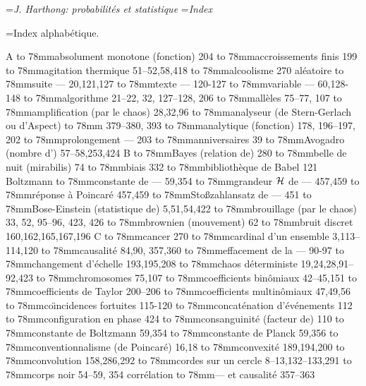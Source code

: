 


\auteurcourant={\sl J. Harthong: probabilit\'es et statistique}
\titrecourant={\sl Index}
\baselineskip=15pt

\def\term#1#2{\hbox to 78mm{#1\dotfill\hskip4pt #2}} 
\def\w{\hskip15pt} 
 
 
\titre={\tit Index alphab\'etique.} 
 
\hbox{A} 
\medskip 
\term{absolument monotone (fonction)}{204} 
\term{accroissements finis}{199} 
\term{agitation thermique}{51--52,58,418} 
\term{alcoolisme}{270} 
\hbox{al\'eatoire} 
\term{\w suite ---}{20,121,127} 
\term{\w texte ---}{120-127} 
\term{\w variable ---}{60,128-148} 
\term{algorithme}{21--22, 32, 127--128, 206} 
\term{all\`eles}{75--77, 107} 
\term{amplification (par le chaos)}{28,32,96} 
\term{analyseur (de Stern-Gerlach ou d'Aspect)}{} 
\term{}{379--380, 393} 
\term{analytique (fonction)}{178, 196--197, 202} 
\term{\w prolongement ---}{203} 
\term{anniversaires}{39} 
\term{Avogadro (nombre d')}{57--58,253,424} 
\vskip8.6mm \vfill  
\hbox{B} 
\medskip 
\term{Bayes (relation de)}{280} 
\term{belle de nuit (mirabilis)}{74} 
\term{biais}{332} 
\term{biblioth\`eque de Babel}{121} 
\hbox{Boltzmann}
\term{\w constante de ---}{59,354} 
\term{\w grandeur ${\cal H}$ de ---}{457,459} 
\term{\w r\'eponse \`a Poincar\'e}{457,459} 
\term{\w Sto{\ss}zahlansatz de ---}{451} 
\term{Bose-Einstein (statistique de)}{5,51,54,422} 
\term{brouillage (par le chaos)}{33, 52, 95--96, 423, 426} 
\term{brownien (mouvement)}{62}  
\term{bruit discret}{160,162,165,167,196} 
\vskip8.6mm \vfill  
\hbox{C} 
\medskip 
\term{cancer}{270} 
\term{cardinal d'un ensemble}{3,113--114,120} 
\term{causalit\'e }{84,90, 357,360} 
\term{\w effacement de la ---}{90-97} 
\term{changement d'\'echelle}{193,195,208} 
\term{chaos d\'eterministe}{19,24,28,91--92,423} 
\term{chromosomes}{75,107} 
\term{coefficients bin\^omiaux}{42--45,151} 
\term{coefficients de Taylor}{200--206} 
\term{coefficients multin\^omiaux}{47,49,56} 
\term{co{\"\i}ncidences fortuites}{115-120} 
\term{concat\'enation d'\'ev\'enements}{112} 
\term{configuration en phase}{424} 
\term{consanguinit\'e (facteur de)}{110} 
\term{constante de Boltzmann}{59,354} 
\term{constante de Planck}{59,356} 
\term{conventionnalisme (de Poincar\'e)}{16,18} 
\term{convexit\'e}{189,194,200} 
\term{convolution}{158,286,292} 
\term{cordes sur un cercle}{8--13,132--133,291} 
\term{corps noir}{54--59, 354} 
\smallskip 
\hbox{corr\'elation} 
\term{\w ---  et causalit\'e}{357--363} 
